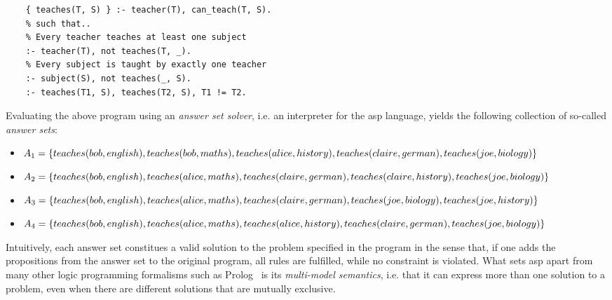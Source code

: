 \begin{example}
\begin{lstlisting}[style=asp-code, caption=School planning in ASP, label={lst:school-planning}]
    % Assign subjects to teachers
    { teaches(T, S) } :- teacher(T), can_teach(T, S).
    % such that..
    % Every teacher teaches at least one subject
    :- teacher(T), not teaches(T, _).
    % Every subject is taught by exactly one teacher
    :- subject(S), not teaches(_, S).
    :- teaches(T1, S), teaches(T2, S), T1 != T2.
\end{lstlisting}    
Evaluating the above program using an \emph{answer set solver}, i.e. an interpreter for the \gls{asp} language, yields the following collection of so-called \emph{answer sets}:
\begin{itemize}
    \item $A_1 = \{teaches(bob,english), teaches(bob,maths), teaches(alice,history),\\teaches(claire,german), teaches(joe,biology)\}$
    \item $A_2 = \{teaches(bob,english), teaches(alice,maths), teaches(claire,german),\\teaches(claire,history), teaches(joe,biology)\}$
    \item $A_3 = \{teaches(bob,english), teaches(alice,maths), teaches(claire,german),\\teaches(joe,biology), teaches(joe,history)\}$
    \item $A_4 = \{teaches(bob,english), teaches(alice,maths), teaches(alice,history),\\teaches(claire,german), teaches(joe,biology)\}$
\end{itemize}
Intuitively, each answer set constitues a valid solution to the problem specified in the program in the sense that, if one adds the propositions from the answer set to the original program, all rules are fulfilled, while no constraint is violated. What sets \gls{asp} apart from many other logic programming formalisms such as Prolog~\cite{prolog-50y} is its \emph{multi-model semantics}, i.e. that it can express more than one solution to a problem, even when there are different solutions that are mutually exclusive.
\end{example}    

